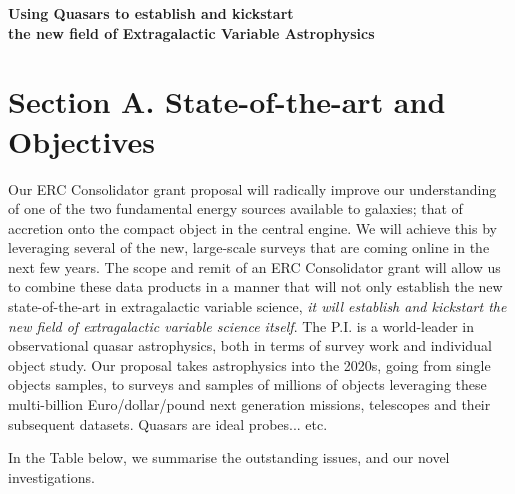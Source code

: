 \documentclass[oneside, a4paper, onecolumn, 11pt]{article}
\begin{document}
\begin{center}
 {\Large \bf \textcolor{Cerulean}{Using Quasars to establish and kickstart \\}}
\vspace{4pt} 
  {\Large \bf \textcolor{Cerulean}{the new field of Extragalactic Variable Astrophysics} }
\end{center}


\section{Section A. State-of-the-art and Objectives}




Our ERC Consolidator grant proposal will radically improve our understanding of 
one of the two fundamental energy sources available to galaxies; that of accretion 
onto the compact object in the central engine. We will achieve this by leveraging 
several of the new, large-scale surveys that are coming online in the next few years. 
The scope and remit of an ERC Consolidator grant will allow us to combine these 
data products in a manner that will 
not only establish the new state-of-the-art in extragalactic variable science, 
{\it it will establish and kickstart the new field of extragalactic variable science itself}. 
The P.I. is a world-leader in observational quasar astrophysics, both in terms of 
survey work and individual object study. 
Our proposal takes astrophysics into the 2020s, going from single objects samples, 
to surveys and samples of millions of objects leveraging these multi-billion Euro/dollar/pound  
next generation missions, telescopes and their subsequent datasets. 
Quasars are ideal probes... etc. 




\newpage

\smallskip
\smallskip
\noindent
In the Table below, we summarise the outstanding issues, and our novel investigations. 

\smallskip
\smallskip

\end{document}
